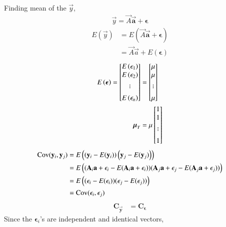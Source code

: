 \documentclass[journal,12pt,onecolumn]{IEEEtran}
\providecommand{\mtx}[1]{\mathbf{#1}}
\theoremstyle{remark}
\begin{document}
Finding mean of the ${\vec{y}}$,
\begin{align}
\vec{y}=\vec{A}\mtx{\vec{a}}+\boldsymbol{\epsilon}
\end{align}
\begin{align}
E(\vec{y})&=E(\vec{A}\mtx{\vec{a}}+\boldsymbol{\epsilon})\\
&=\vec{A}\vec{a}+E(\boldsymbol{\epsilon})
\end{align}
\begin{align}
E\brak{\boldsymbol{{\epsilon}}} = \begin{bmatrix}
E\brak{{\epsilon}_1} \\%
E\brak{{\epsilon}_2} \\%
. \\[-10pt]
. \\[-10pt]
. \\[5pt]
E\brak{{\epsilon}_n}
\end{bmatrix}&=\begin{bmatrix}
\mu \\%
\mu \\%
. \\[-10pt]
. \\[-10pt]
. \\[5pt]
\mu
\end{bmatrix}\\
\vec{\boldsymbol{\mu}}_{Y}&=\mu \begin{bmatrix}
1 \\%
1 \\%
. \\[-10pt]
. \\[-10pt]
. \\[5pt]
1
\end{bmatrix}
\end{align}
\begin{align}
\textrm{Cov}({\mathbf{y}}_i,{\mathbf{y}}_j)&=E\left(\left({\mathbf{y}}_i-E({\mathbf{y}}_i)\right)\left({\mathbf{y}}_j-E({\mathbf{y}}_j)\right)\right)\\
&=E\left(({\mathbf{A}}_i\mathbf{a}+{\epsilon}_i-E({\mathbf{A}}_i\mathbf{a}+{\epsilon}_i))({\mathbf{A}}_j\mathbf{a}+{\epsilon}_j-E({\mathbf{A}}_j\mathbf{a}+{\epsilon}_j))\right)\\
&=E\left(({\epsilon}_i-E({\epsilon}_i))({\epsilon}_j-E({\epsilon}_j))\right)\\
&=\textrm{Cov}({\epsilon}_i,{\epsilon}_j)
\end{align}
\begin{align}
 \mathbf{C_{\vec{y}}}&=\mathbf{C_{\boldsymbol{\epsilon}}}
 \end{align}
 Since the $\boldsymbol{\epsilon}_i$'s are independent and identical vectors, 
\end{document}
